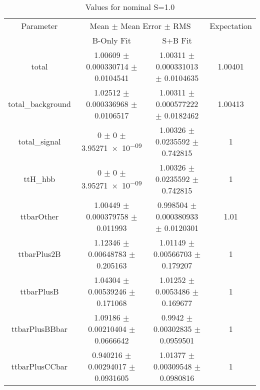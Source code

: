 \begin{table}
\centering
\caption{Values for nominal S=1.0}
\begin{tabular}{cccc}
\toprule
Parameter & \multicolumn{2}{c}{Mean $\pm$ Mean Error $\pm$ RMS} & Expectation\\
 & B-Only Fit & S+B Fit & \\
\midrule
total & \num{1.00609} $\pm$ \num{0.000330714} $\pm$ \num{0.0104541} & \num{1.00311} $\pm$ \num{0.000331013} $\pm$ \num{0.0104635} & \num{1.00401}\\
total\_background & \num{1.02512} $\pm$ \num{0.000336968} $\pm$ \num{0.0106517} & \num{1.00311} $\pm$ \num{0.000577222} $\pm$ \num{0.0182462} & \num{1.00413}\\
total\_signal & \num{0} $\pm$ \num{0} $\pm$ \num{3.95271e-09} & \num{1.00326} $\pm$ \num{0.0235592} $\pm$ \num{0.742815} & \num{1}\\
ttH\_hbb & \num{0} $\pm$ \num{0} $\pm$ \num{3.95271e-09} & \num{1.00326} $\pm$ \num{0.0235592} $\pm$ \num{0.742815} & \num{1}\\
ttbarOther & \num{1.00449} $\pm$ \num{0.000379758} $\pm$ \num{0.011993} & \num{0.998504} $\pm$ \num{0.000380933} $\pm$ \num{0.0120301} & \num{1.01}\\
ttbarPlus2B & \num{1.12346} $\pm$ \num{0.00648783} $\pm$ \num{0.205163} & \num{1.01149} $\pm$ \num{0.00566703} $\pm$ \num{0.179207} & \num{1}\\
ttbarPlusB & \num{1.04304} $\pm$ \num{0.00539246} $\pm$ \num{0.171068} & \num{1.01252} $\pm$ \num{0.0053486} $\pm$ \num{0.169677} & \num{1}\\
ttbarPlusBBbar & \num{1.09186} $\pm$ \num{0.00210404} $\pm$ \num{0.0666642} & \num{0.9942} $\pm$ \num{0.00302835} $\pm$ \num{0.0959501} & \num{1}\\
ttbarPlusCCbar & \num{0.940216} $\pm$ \num{0.00294017} $\pm$ \num{0.0931605} & \num{1.01377} $\pm$ \num{0.00309548} $\pm$ \num{0.0980816} & \num{1}\\
\bottomrule
\end{tabular}
\end{table}